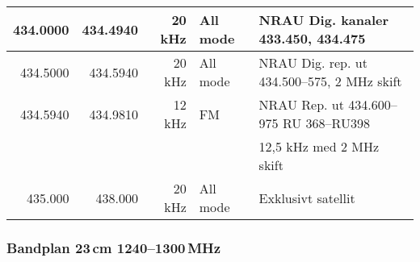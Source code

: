 \begin{tabular}{rrrll}
434.0000 & 434.4940 & 20 kHz  & All mode     & NRAU Dig. kanaler 433.450, 434.475                \\ \hline
434.5000 & 434.5940 & 20 kHz  & All mode     & NRAU Dig. rep. ut 434.500--575, 2 MHz skift       \\ \hline
434.5940 & 434.9810 & 12 kHz  & FM           & NRAU Rep. ut 434.600--975 RU 368--RU398           \\
&          &         &              & 12,5 kHz med 2 MHz skift                          \\ \hline
435.000  & 438.000  & 20 kHz  & All mode     & Exklusivt satellit\\
\end{tabular}

\subsubsection{Bandplan 23\,cm 1240--1300\,MHz}
